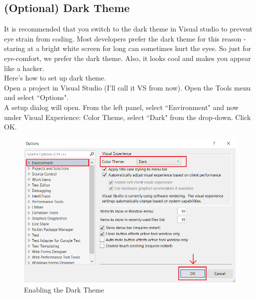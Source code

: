 \documentclass[letterpaper, 12pt]{book}
\begin{document}
\subsection{(Optional) Dark Theme}
It is recommended that you switch to the dark theme in Visual studio to prevent eye strain from coding. Most developers prefer the dark theme for this reason - staring at a bright white screen for long can sometimes hurt the eyes. So just for eye-comfort, we prefer the dark theme. Also, it looks cool and makes you appear like a hacker.\\
Here's how to set up dark theme.\\
Open a project in Visual Studio (I'll call it VS from now). Open the Tools menu and select ``Options".\\
A setup dialog will open. From the left panel, select ``Environment" and now under Visual Experience: Color Theme, select ``Dark" from the drop-down. Click OK.
\begin{figure}[h]
\centering
\includegraphics[scale=0.6]{img/dark}
\caption{Enabling the Dark Theme}\label{dark}
\end{figure}
\end{document}
